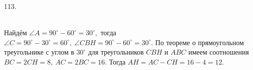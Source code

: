 113. \begin{figure}[ht!]
\end{figure}\\
Найдём $\angle A=90^\circ-60^\circ=30^\circ,$ тогда $\angle C=90^\circ-30^\circ=60^\circ,\ \angle CBH=90^\circ-60^\circ=30^\circ.$ По теореме о прямоугольном треугольнике с углом в $30^\circ$ для треугольников $CBH$ и $ABC$ имеем соотношения $BC=2CH=8,\ AC=2BC=16.$ Тогда $AH=AC-CH=16-4=12.$\\
